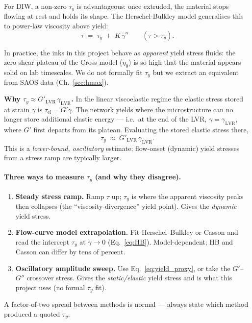 \documentclass[11pt,a4paper]{article}
\newcommand{\gd}{\dot{\gamma}}
\begin{document}
For DIW, a non-zero $\tau_y$ is advantageous: once extruded, the
material stops flowing at rest and holds its shape. The Herschel-Bulkley
model generalises this to power-law viscosity above yield:
\begin{equation}
\tau \;=\; \tau_y \;+\; K\,\gd^n \qquad (\tau > \tau_y).
\label{eq:HB}
\end{equation}

In practice, the inks in this project behave as \emph{apparent} yield
stress fluids: the zero-shear plateau of the Cross model ($\eta_0$) is
so high that the material appears solid on lab timescales. We do not
formally fit $\tau_y$ but we extract an equivalent from SAOS data
(Ch.~\ref{sec:hmax}).

\begin{derivationbox}
\textbf{Why $\tau_y \approx G'_\mathrm{LVR}\,\gamma_\mathrm{LVR}$.}
In the linear viscoelastic regime the elastic stress stored at strain
$\gamma$ is $\tau_\mathrm{el}=G'\gamma$. The network yields where the
microstructure can no longer store additional elastic energy --- i.e.\ at
the end of the LVR, $\gamma=\gamma_\mathrm{LVR}$, where $G'$ first departs
from its plateau. Evaluating the stored elastic stress there,
\begin{equation}
\tau_y \;\approx\; G'_\mathrm{LVR}\,\gamma_\mathrm{LVR}.
\label{eq:yield_proxy}
\end{equation}
This is a \emph{lower-bound, oscillatory} estimate; flow-onset (dynamic)
yield stresses from a stress ramp are typically larger.
\end{derivationbox}

\paragraph{Three ways to measure $\tau_y$ (and why they disagree).}
\begin{enumerate}[leftmargin=1.6em,itemsep=2pt]
\item \textbf{Steady stress ramp.} Ramp $\tau$ up; $\tau_y$ is where the
  apparent viscosity peaks then collapses (the ``viscosity-divergence''
  yield point). Gives the \emph{dynamic} yield stress.
\item \textbf{Flow-curve model extrapolation.} Fit Herschel--Bulkley or
  Casson and read the intercept $\tau_y$ at $\gd\to0$ (Eq.~\ref{eq:HB}).
  Model-dependent; HB and Casson can differ by tens of percent.
\item \textbf{Oscillatory amplitude sweep.} Use Eq.~\ref{eq:yield_proxy},
  or take the $G'$--$G''$ crossover stress. Gives the \emph{static/elastic}
  yield stress and is what this project uses (no formal $\tau_y$ fit).
\end{enumerate}
A factor-of-two spread between methods is normal --- always state which
method produced a quoted $\tau_y$.
\end{document}
